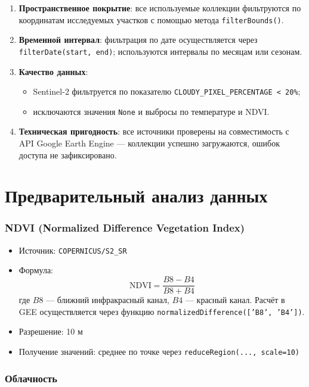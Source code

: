 \begin{enumerate}
	\item \textbf{Пространственное покрытие}: все используемые коллекции фильтруются по координатам исследуемых участков с помощью метода \texttt{filterBounds()}.
	
	\item \textbf{Временной интервал}: фильтрация по дате осуществляется через \texttt{filterDate(start, end)}; используются интервалы по месяцам или сезонам.
	
	\item \textbf{Качество данных}:
	\begin{itemize}
		\item Sentinel-2 фильтруется по показателю \texttt{CLOUDY\_PIXEL\_PERCENTAGE < 20\%};
		\item исключаются значения \texttt{None} и выбросы по температуре и NDVI.
	\end{itemize}
	
	\item \textbf{Техническая пригодность}: все источники проверены на совместимость с API Google Earth Engine — коллекции успешно загружаются, ошибок доступа не зафиксировано.
\end{enumerate}

\section{Предварительный анализ данных}

\subsubsection*{NDVI (Normalized Difference Vegetation Index)}

\begin{itemize}
	\item Источник: \texttt{COPERNICUS/S2\_SR}
	\item Формула:
	\[
	\text{NDVI} = \frac{B8 - B4}{B8 + B4}
	\]
	где $B8$ — ближний инфракрасный канал, $B4$ — красный канал. Расчёт в GEE осуществляется через функцию \texttt{normalizedDifference(['B8', 'B4'])}.
	\item Разрешение: 10 м
	\item Получение значений: среднее по точке через \texttt{reduceRegion(..., scale=10)}
\end{itemize}

\subsubsection*{Облачность}

